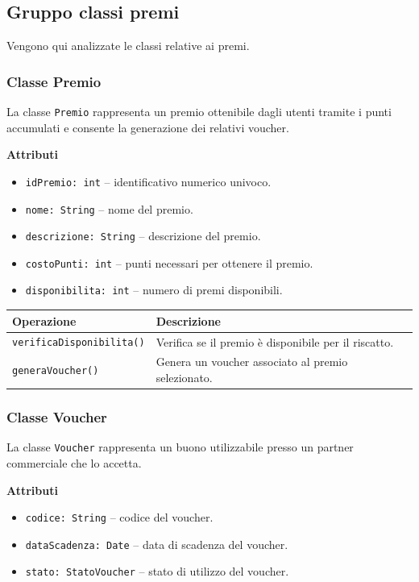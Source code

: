 \documentclass[12pt,a4paper]{article}
\begin{document}
\subsection{Gruppo classi premi} 
Vengono qui analizzate le classi relative ai premi.

\subsubsection{Classe Premio}
La classe \texttt{Premio} rappresenta un premio ottenibile dagli utenti 
tramite i punti accumulati e consente la generazione dei relativi voucher.

\textbf{Attributi}
\begin{itemize}
    \item \texttt{idPremio: int} -- identificativo numerico univoco.
    \item \texttt{nome: String} -- nome del premio.
    \item \texttt{descrizione: String} -- descrizione del premio.
    \item \texttt{costoPunti: int} -- punti necessari per ottenere il premio.
    \item \texttt{disponibilita: int} -- numero di premi disponibili.
\end{itemize}

\begin{table}[H]
\centering
\begin{tabularx}{\textwidth}{@{}lX@{}}
\toprule
\textbf{Operazione} & \textbf{Descrizione} \\ \midrule
\texttt{verificaDisponibilita()} & Verifica se il premio è disponibile per il riscatto. \\
\texttt{generaVoucher()} & Genera un voucher associato al premio selezionato. \\
\bottomrule
\end{tabularx}
\end{table}

\subsubsection{Classe Voucher}
La classe \texttt{Voucher} rappresenta un buono utilizzabile presso un partner commerciale che lo accetta.

\textbf{Attributi}
\begin{itemize}
    \item \texttt{codice: String} -- codice del voucher.
    \item \texttt{dataScadenza: Date} -- data di scadenza del voucher.
    \item \texttt{stato: StatoVoucher} -- stato di utilizzo del voucher.
\end{itemize}
\end{document}

